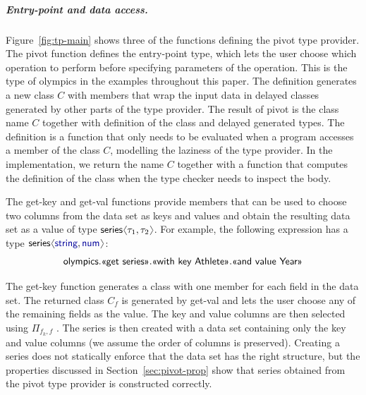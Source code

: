 \documentclass[a4paper,UKenglish]{lipics-v2016}
\theoremstyle{plain}
\theoremstyle{definition}
\newcommand{\langl}{\begin{picture}(4.5,7)
\put(1.1,2.5){\rotatebox{60}{\line(1,0){5.5}}}
\put(1.1,2.5){\rotatebox{300}{\line(1,0){5.5}}}
\end{picture}}
\newcommand{\rangl}{\begin{picture}(4.5,7)
\put(.9,2.5){\rotatebox{120}{\line(1,0){5.5}}}
\put(.9,2.5){\rotatebox{240}{\line(1,0){5.5}}}
\end{picture}}
\newcommand{\ball}[1]{\FPeval{\result}{clip(201+#1)}\textnormal{\ding{\result}}}
\newcommand{\kvd}[1]{\textnormal{\textcolor{kvdclr}{\sffamily #1}}}
\newcommand{\ident}[1]{\textnormal{\sffamily #1}}
\newcommand{\qident}[1]{\textnormal{\sffamily \guillemotleft #1\guillemotright}}
\begin{document}
\subparagraph{Entry-point and data access.} Figure~\ref{fig:tp-main} shows three of the functions
defining the pivot type provider. The \ident{pivot} function \ball{1} defines the entry-point type, 
which lets the user choose which operation to perform before specifying parameters of the operation. 
This is the type of \ident{olympics} in the examples throughout this paper. The definition generates 
a new class $C$ with members that wrap the input data in delayed classes generated by other parts
of the type provider. The result of \ident{pivot} is the class name $C$ together with definition of 
the class and delayed generated types. The definition is a function that only needs to be evaluated 
when a program accesses a member of the class $C$, modelling the laziness of the type provider.
In the implementation, we return the name $C$ together with a function that computes the definition 
of the class when the type checker needs to inspect the body.

The \ident{get-key} \ball{2} and \ident{get-val} \ball{3} functions provide members that can be used 
to choose two columns from the data set as keys and values and obtain the resulting data set as a 
value of type $\ident{series}\langl \tau_1, \tau_2 \rangl$. For example, the following expression 
has a type $\ident{series}\langl \kvd{string}, \kvd{num} \rangl$:
%
\begin{equation*}
\begin{array}{l}
\ident{olympics}.\qident{get series}.\qident{with key Athlete}.\qident{and value Year}
\end{array}
\end{equation*}

\noindent
The \ident{get-key} function generates a class with one member for each field in the data set.
The returned class $C_f$ is generated by \ident{get-val} and lets the user choose any of the 
remaining fields as the value. The key and value columns are then selected using $\Pi_{f_k,f}$ \ball{4}.
The series is then created with a data set containing only the key and value columns (we assume 
the order of columns is preserved). Creating a series does not statically enforce that the 
data set has the right structure, but the properties discussed in Section~\ref{sec:pivot-prop} show 
that series obtained from the pivot type provider is constructed correctly.

\end{document}
